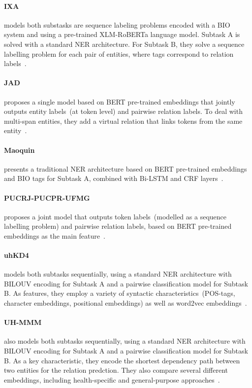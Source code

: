 \documentclass[a4paper,11pt,twocolumn,twoside]{article}
\begin{document}
  \paragraph{IXA} models both substasks are sequence labeling problems encoded with a BIO system and using a pre-trained XLM-RoBERTa language model. Subtask A is solved with a standard NER architecture. For Subtask B, they solve a sequence labelling problem for each pair of entities, where tags correspond to relation labels~\cite{edgarandres2021}.

  \paragraph{JAD} proposes a single model based on BERT pre-trained embeddings that jointly outputs entity labels~(at token level) and pairwise relation labels. To deal with multi-span entities, they add a virtual relation that links tokens from the same entity~\cite{JAD2021}.

  \paragraph{Maoquin} presents a traditional NER architecture based on BERT pre-trained embeddings and BIO tags for Subtask A, combined with Bi-LSTM and CRF layers~\cite{Maoqin2021}.

  \paragraph{PUCRJ-PUCPR-UFMG} proposes a joint model that outputs token labels~(modelled as a sequence labelling problem) and pairwise relation labels, based on BERT pre-trained embeddings as the main feature~\cite{lucas2021}.

  \paragraph{uhKD4} models both subtasks sequentially, using a standard NER architecture with BILOUV encoding for Subtask A and a pairwise classification model for Subtask B. As features, they employ a variety of syntactic characteristics~(POS-tags, character embeddings, positional embeddings) as well as word2vec embeddings~\cite{uhKD42021}.

  \paragraph{UH-MMM} also models both subtasks sequentially, using a standard NER architecture with BILOUV encoding for Subtask A and a pairwise classification model for Subtask B. As a key characteristic, they encode the shortest dependency path between two entities for the relation predction. They also compare several different embeddings, including health-specific and general-purpose approaches~\cite{uhmmm2021}.
\end{document}
